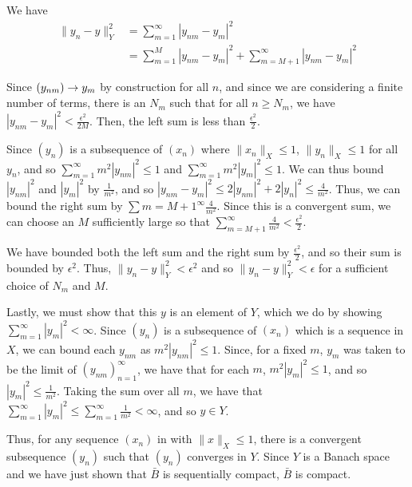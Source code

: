 \documentclass{hmwk}
\begin{document}
\begin{solution}
\begin{itemize}
    We have \begin{align*}
        \|y_n - y\|^2_Y &= \sum_{m=1}^\infty |y_{nm} - y_m|^2 \\
        &= \sum_{m=1}^M|y_{nm} - y_m|^2 + \sum_{m=M+1}^\infty |y_{nm} - y_m|^2
    \end{align*}

    Since $(y_{nm}) \rightarrow y_m$ by construction for all $n$, and since we are considering a finite number of terms, there is an $N_m$ such that for all $n \geq N_m$, we have $|y_{nm} - y_m|^2 < \frac{\epsilon^2}{2M}$. Then, the left sum is less than $\frac{\epsilon^2}{2}$.

    Since $(y_n)$ is a subsequence of $(x_n)$ where $\|x_n\|_X \leq 1$, $\|y_n\|_X \leq 1$ for all $y_n$, and so $\sum_{m=1}^\infty m^2|y_{nm}|^2 \leq 1$ and $\sum_{m=1}^\infty m^2|y_{m}|^2 \leq 1$. We can thus bound $|y_{nm}|^2$ and $|y_{m}|^2$ by $\frac{1}{m^2}$, and so $|y_{nm} - y_m|^2 \leq 2|y_{nm}|^2 + 2|y_n|^2 \leq \frac{4}{m^2}$. Thus, we can bound the right sum by $\sum{m=M+1}^\infty \frac{4}{m^2}$. Since this is a convergent sum, we can choose an $M$ sufficiently large so that $\sum_{m=M+1}^\infty \frac{4}{m^2} < \frac{\epsilon^2}{2}$.

    We have bounded both the left sum and the right sum by $\frac{\epsilon^2}{2}$, and so their sum is bounded by $\epsilon^2$. Thus, $\|y_n - y\|_Y^2 < \epsilon^2$ and so $\|y_n-y\|_Y^2 < \epsilon$ for a sufficient choice of $N_m$ and $M$. 
    
    Lastly, we must show that this $y$ is an element of $Y$, which we do by showing $\sum_{m=1}^\infty |y_m|^2 < \infty$. Since $(y_n)$ is a subsequence of $(x_n)$ which is a sequence in $X$, we can bound each $y_{nm}$ as $m^2|y_{nm}|^2 \leq 1$. Since, for a fixed $m$, $y_m$ was taken to be the limit of $(y_{nm})_{n=1}^\infty$, we have that for each $m$, $m^2|y_m|^2 \leq 1$, and so $|y_m|^2 \leq \frac{1}{m^2}$. Taking the sum over all $m$, we have that $\sum_{m=1}^\infty |y_m|^2 \leq \sum_{m=1}^\infty \frac{1}{m^2} < \infty$, and so $y \in Y$. 
    
    Thus, for any sequence $(x_n)$ in with $\|x\|_X \leq 1$, there is a convergent subsequence $(y_n)$ such that $(y_n)$ converges in $Y$. Since $Y$ is a Banach space and we have just shown that $\bar{B}$ is sequentially compact, $\bar{B}$ is compact. 
\end{itemize}
\end{solution}
\end{document}
